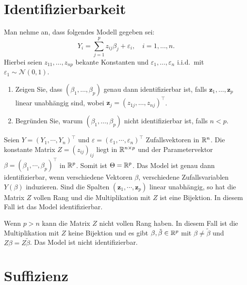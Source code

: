 
\section{Identifizierbarkeit}

Man nehme an, dass folgendes Modell gegeben sei: 
\begin{equation*}
    Y_i = \sum_{j=1}^{p} z_{ij} \beta_j + \varepsilon_i, \quad i=1,\ldots,n. 
\end{equation*}
Hierbei seien $z_{11},\ldots,z_{np}$ bekante Konstanten und $\varepsilon_1,\ldots,\varepsilon_n$
i.i.d.\ mit $\varepsilon_1 \sim \mathcal N\left( 0,1 \right)$.
\begin{enumerate}
    \item Zeigen Sie, dass $\left( \beta_1,\ldots,\beta_p \right)$ genau dann
        identifizierbar ist, falls $\mathbf z_1,\ldots,\mathbf z_p$ linear
        unabhängig sind, wobei $\mathbf z_j = \left( z_{1j},\ldots,z_{nj}
        \right)^\top$.
    \item Begründen Sie, warum $\left( \beta_1, \ldots,\beta_p \right)$ nicht
        identifizierbar ist, falls $n<p$.
\end{enumerate}

\solution
Seien $Y = \left( Y_1, \cdots, Y_n \right)^\top$ und $\varepsilon = \left(
\varepsilon_1, \cdots, \varepsilon_n \right)^\top$ Zufallsvektoren in $\mathbb R^{n}$.
Die konstante Matrix $Z=\left( z_{ij} \right)_{ij}$ liegt in $\mathbb R^{n \times p}$
und der Parametervektor $\beta = \left( \beta_1, \cdots, \beta_p
\right)^{\top}$ in $\mathbb R^{p}$.  Somit ist $\Theta = \mathbb R^{p}$. Das Model ist genau
dann identifizierbar, wenn verschiedene Vektoren $\beta$, verschiedene
Zufallsvariablen $Y(\beta)$ induzieren. Sind die Spalten $\left( \mathbf{z}_1,
\cdots, \mathbf{z}_p \right)$ linear unabhängig, so hat die Matrix $Z$ vollen
Rang und die Multiplikation mit $Z$ ist eine Bijektion. In diesem Fall ist das
Model identifizierbar. 

Wenn $p>n$ kann die Matrix $Z$ nicht vollen Rang haben. In diesem Fall ist die
Multiplikation mit $Z$ keine Bijektion und es gibt $\beta,\tilde \beta \in
\mathbb R^{p}$ mit $\beta \neq \tilde \beta$ und $Z \beta = Z \tilde \beta$. Das Model
ist nicht identifizierbar. 



\section{Suffizienz}


